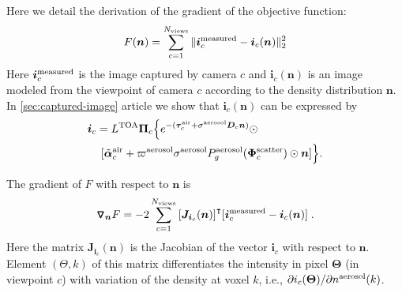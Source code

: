 \documentclass[10pt,letterpaper]{article}
\newcommand{\Grad}[1]{\bm{\triangledown_{#1}}}
\newcommand{\vect}[1]{\bm{#1}}
\newcommand{\transpose}[1]{{#1}^\intercal}
\begin{document}
Here we detail the derivation of the gradient of the objective
function:
\begin{equation}
  \label{eq:objectiveA}
  F({\bm n})
  = \sum_{c=1}^{N_{\rm views}}
  \| {\bm i}^{\rm measured}_c - {\bm i}_c({\bm n})\|^2_2
\end{equation}
Here ${\bm i}^{\rm measured}_c$ is the image captured by camera $c$
and ${\bm i}_c({\bm n})$ is an image modeled from the viewpoint of
camera $c$ according to the density distribution ${\bm n}$. In
\cref{sec:captured-image} article we show that ${\bm i}_c({\bm n})$
can be expressed by
\begin{align}
  {\bm i}_c= L^{\rm TOA} {\vect{\Pi}}_c \Big\{ e^{-(\vect{\tau}_c^{\rm
      air} + {\sigma}^{\rm aerosol} {\bm D}_c {\bm n}) }\odot
  \;\;\;\;\;\;\;\;\;\;\;\;\;\;\;\;\;\;\;\;\;
  \nonumber \\
  [\tilde{\vect{\alpha}}^{\rm air}_c + %
  \varpi^{\rm aerosol}\sigma^{\rm aerosol} P^{\rm
    aerosol}_g(\vect{\Phi}^{\rm scatter}_c) \odot{\bm n} ] \Big\} .
  \label{eq:bigIA}
\end{align}

The gradient of $F$ with respect to ${\bm n}$ is
\begin{align}
  \Grad{{\bm n}} F = -2\sum_{c=1}^{N_{\rm views}}
  \transpose{\left[{\bm J}_{{\bm i}_c}({\bm n})\right]} [{\bm i}^{\rm
    measured}_c - {\bm i}_c({\bm n})] \;.
  \label{eq:gradient1}
\end{align}
Here the matrix ${\bm J}_{{\bm i}_c}({\bm n})$ is the Jacobian of the
vector ${\bm i}_c$ with respect to ${\bm n}$. Element $(\Theta,k)$ of
this matrix differentiates the intensity in pixel ${\bm \Theta}$ (in
viewpoint $c$) with variation of the density at voxel $k$, i.e.,
$\partial i_c({\bm \Theta})/\partial{n^{\rm aerosol}(k)}$.
\end{document}
